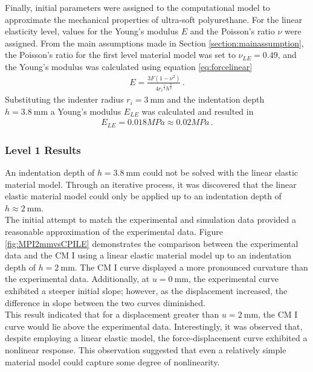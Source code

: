 Finally, initial parameters were assigned to the computational model to approximate the mechanical properties of ultra-soft polyurethane. 
For the linear elasticity level, values for the Young's modulus $E$ and the Poisson's ratio $\nu$ were assigned. 
From the main assumptions made in Section \ref{section:mainassumption}, the Poisson's ratio for the first 
level material model was set to $\nu_{LE} =  0.49$, and the Young's modulus was calculated using equation \ref{eq:forcelinear}
\begin{align}
    E = \frac{3F(1-\nu^2)} {4{r_i}^{\frac{1}{2}} {h}^{\frac{3}{2}}}\, .
    \label{eq:forcelinearcp1}
\end{align}
Substituting the indenter radius $r_i = \SI{3}{\milli \meter}$ and the indentation depth $h = \SI{3.8}{\milli \meter}$ a Young's modulus $E_{LE}$ was calculated and resulted in 
\begin{align}
    E_{LE} = 0.018 MPa \approx 0.02 MPa \, .
    \label{eq:Elinearcp1}
\end{align}


\subsubsection*{Level 1 Results}
\label{subsection:level1cmI}
An indentation depth of $h = \SI{3.8}{\milli \meter}$ could not be solved with the linear elastic material model. 
Through an iterative process, it was discovered that the linear elastic material model could only be applied 
up to an indentation depth of $h \approx \SI{2}{\milli \meter}$.\\

The initial attempt to match the experimental and simulation data provided a reasonable approximation of the experimental data.
Figure \ref{fig:MPI2mmvsCPILE} demonstrates the comparison between the experimental data and the CM I using a 
linear elastic material model up to an indentation depth of $h = \SI{2}{\milli \meter}$. The CM I curve displayed 
a more pronounced curvature than the experimental data. Additionally, at $u =\SI{0}{\milli \meter}$, 
the experimental curve exhibited a steeper initial slope; however, as the displacement increased, the 
difference in slope between the two curves diminished.\\

This result indicated that for a displacement greater than $u = \SI{2}{\milli \meter}$, the CM I curve would 
lie above the experimental data. Interestingly, it was observed that, despite employing a linear elastic model, 
the force-displacement curve exhibited a nonlinear response. This observation suggested that even a relatively 
simple material model could capture some degree of nonlinearity. 

